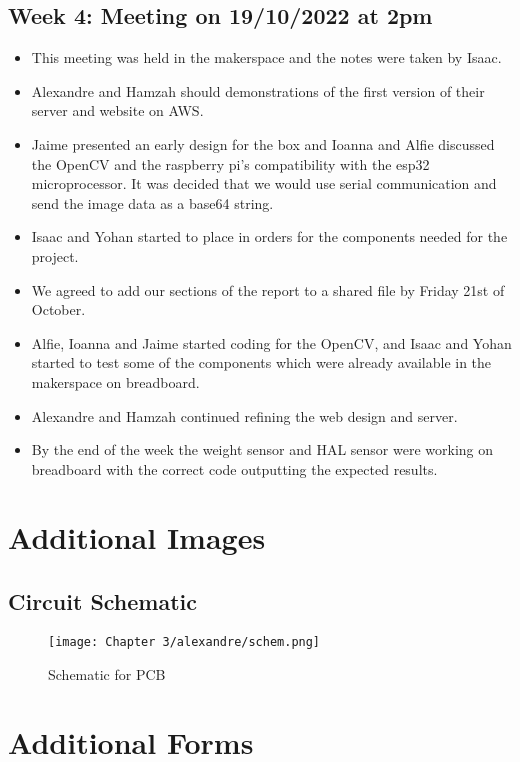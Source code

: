 \subsection*{Week 4: Meeting on 19/10/2022 at 2pm }
\begin{itemize}
    \item This meeting was held in the makerspace and the notes were taken by Isaac. 
    \item Alexandre and Hamzah should demonstrations of the first version of their server and website on AWS. 
    \item Jaime presented an early design for the box and Ioanna and Alfie discussed the OpenCV and the raspberry pi's compatibility with the esp32 microprocessor. It was decided that we would use serial communication and send the image data as a base64 string.  
    \item Isaac and Yohan started to place in orders for the components needed for the project.  
    \item We agreed to add our sections of the report to a shared file by Friday 21st of October. 
    \item Alfie, Ioanna and Jaime started coding for the OpenCV, and Isaac and Yohan started to test some of the components which were already available in the makerspace on breadboard. 
    \item Alexandre and Hamzah continued refining the web design and server. 
    \item By the end of the week the weight sensor and HAL sensor were working on breadboard with the correct code outputting the expected results. 
\end{itemize}

\section{Additional Images}
\subsection{Circuit Schematic}
\label{sec:schem}
\begin{figure}[H]        
    \centering
    \texttt{[image: Chapter 3/alexandre/schem.png]}
    \caption{Schematic for PCB}
\end{figure} 

\section{Additional Forms}






